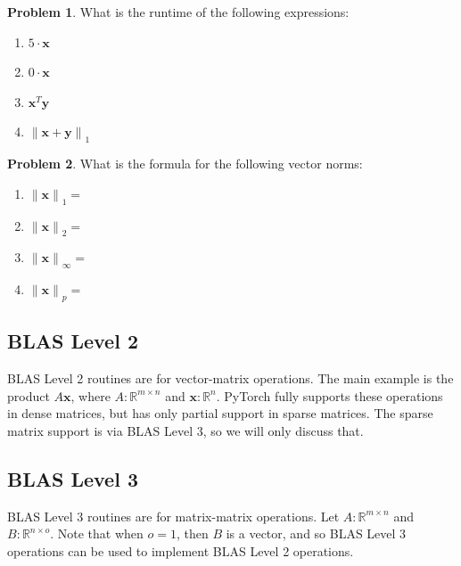 \documentclass[10pt]{article}
\theoremstyle{definition}
\newtheorem{problem}{Problem}
\newcommand{\R}{\mathbb R}
\newcommand{\trans}[1]{{#1}^{T}}
\newcommand{\x}{\mathbf x}
\newcommand{\y}{\mathbf y}
\newcommand{\lone}[1]{{\lVert {#1} \rVert}_1}
\newcommand{\ltwo}[1]{{\lVert {#1} \rVert}_2}
\newcommand{\lp}[1]{{\lVert {#1} \rVert}_p}
\newcommand{\linf}[1]{{\lVert {#1} \rVert}_\infty}
\begin{document}
\begin{problem}
    What is the runtime of the following expressions:
    \begin{enumerate}
        \item $5 \cdot \x$
            \vspace{1in}
        \item $0 \cdot \x$
            \vspace{1in}
        \item $\trans\x \y$
            \vspace{1in}
        \item $\lone{\x+\y}$
            \vspace{1in}
    \end{enumerate}
\end{problem}

\begin{problem}
    What is the formula for the following vector norms:
    \begin{enumerate}
        \item $\lone{\x}=$
            \vspace{1in}
        \item $\ltwo{\x}=$
            \vspace{1in}
        \item $\linf{\x}=$
            \vspace{1in}
        \item $\lp{\x}=$
            \vspace{1in}
    \end{enumerate}
\end{problem}

\subsection{BLAS Level 2}

BLAS Level 2 routines are for vector-matrix operations.
The main example is the product $A\x$, 
where $A : \R^{m\times n}$ and $\x : \R^{n}$.
PyTorch fully supports these operations in dense matrices,
but has only partial support in sparse matrices.
The sparse matrix support is via BLAS Level 3,
so we will only discuss that.

\subsection{BLAS Level 3}

BLAS Level 3 routines are for matrix-matrix operations.
Let $A : \R^{m\times n}$ and $B : \R^{n \times o}$.
Note that when $o=1$, then $B$ is a vector, and so BLAS Level 3 operations can be used to implement BLAS Level 2 operations.
\end{document}
